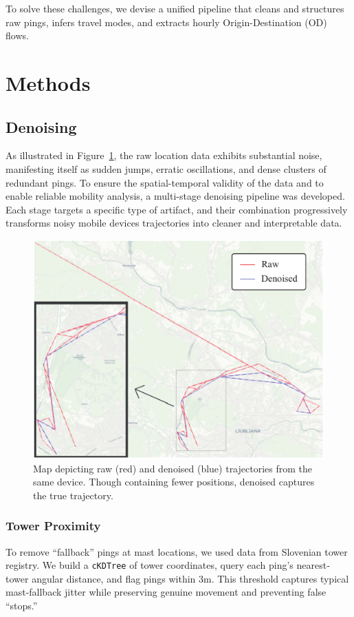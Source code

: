 \documentclass[fleqn,moreauthors,10pt]{ds_report}
\begin{document}
To solve these challenges, we devise a unified pipeline that cleans and structures raw pings, infers travel modes, and extracts hourly Origin-Destination (OD) flows.


\section*{Methods}

\subsection*{Denoising}
As illustrated in Figure~\ref{fig:trace}, the raw location data exhibits substantial noise, manifesting itself as sudden jumps, erratic oscillations, and dense clusters of redundant pings. To ensure the spatial-temporal validity of the data and to enable reliable mobility analysis, a multi-stage denoising pipeline was developed. Each stage targets a specific type of artifact, and their combination progressively transforms noisy mobile devices trajectories into cleaner and interpretable data.

\begin{figure}[hbt]\centering
	\includegraphics[width=\linewidth]{fig/traces_final.pdf}
	\caption{Map depicting raw (red) and denoised (blue) trajectories from the same device. Though containing fewer positions, denoised captures the true trajectory.}
	\label{fig:trace}
\end{figure}

\subsubsection*{Tower Proximity}
To remove “fallback” pings at mast locations, we used data from Slovenian tower registry. We build a \texttt{cKDTree} of tower coordinates, query each ping’s nearest‐tower angular distance, and flag pings within 3m. This threshold captures typical mast‐fallback jitter while preserving genuine movement and preventing false “stops.”
\end{document}
